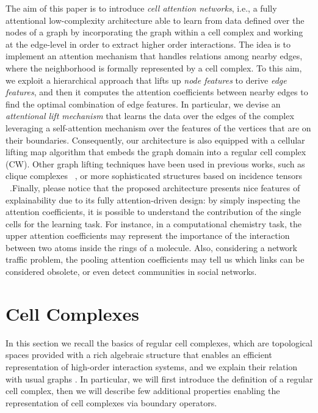 \documentclass{article}
\begin{document}
The aim of this paper is to introduce \textit{cell attention networks}, i.e., a fully  attentional low-complexity architecture able to learn from data defined over the nodes of a graph by incorporating the graph within a cell complex and working at the edge-level in order to extract higher order interactions. The idea is to implement an attention mechanism that handles relations among nearby edges, where the neighborhood is formally represented by a cell complex. To this aim, we exploit a hierarchical approach that lifts up {\it node features} to derive {\it edge features}, and then it computes the attention coefficients between nearby edges to find the optimal combination of edge features. In particular, we devise an \emph{attentional lift mechanism} that learns the data over the edges of the complex leveraging a self-attention mechanism over the features of the vertices that are on their boundaries. Consequently, our architecture is also equipped with a cellular lifting map algorithm that embeds the graph domain into a regular cell complex (CW).   Other graph lifting techniques have been used in previous works, such as  clique complexes ~\cite{Ferri2018,Milo2002}, or more sophisticated structures based on incidence tensors ~\cite{albooyeh-etal-2020-sample}.Finally, please notice that the proposed  architecture presents nice features of explainability due to its fully attention-driven design: by simply inspecting the attention coefficients, it is possible to understand the contribution of the single cells for the learning task. For instance, in a computational chemistry task, the upper attention coefficients may represent the importance of the interaction between two atoms inside the rings of a molecule. Also, considering a network traffic problem, the pooling attention coefficients may tell us which links can be considered obsolete, or even detect communities in social networks. 



\section{Cell Complexes}


In this section we recall the basics of regular cell complexes,  which are topological spaces provided with a rich algebraic structure that enables an efficient representation of high-order interaction systems, and we explain their relation with usual graphs . In particular, we will first introduce the  definition of a regular cell complex, then we will describe few additional properties enabling the representation of cell complexes via boundary operators.
\end{document}
